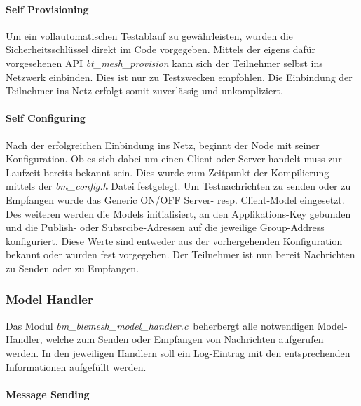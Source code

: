 \paragraph{Self Provisioning}

Um ein vollautomatischen Testablauf zu gewährleisten, wurden die Sicherheitsschlüssel direkt im Code vorgegeben. Mittels der eigens dafür vorgesehenen API \textit{bt\_mesh\_provision} kann sich der Teilnehmer selbst ins Netzwerk einbinden. Dies ist nur zu Testzwecken empfohlen. Die Einbindung der Teilnehmer ins Netz erfolgt somit zuverlässig und unkompliziert.\\

\paragraph{Self Configuring}

Nach der erfolgreichen Einbindung ins Netz, beginnt der Node mit seiner Konfiguration. Ob es sich dabei um einen Client oder Server handelt muss zur Laufzeit bereits bekannt sein. Dies wurde zum Zeitpunkt der Kompilierung mittels der \textit{bm\_config.h} Datei festgelegt. Um Testnachrichten zu senden oder zu Empfangen wurde das Generic ON/OFF Server- resp. Client-Model eingesetzt. Des weiteren werden die Models initialisiert, an den Applikations-Key gebunden und die Publish- oder Subsrcibe-Adressen auf die jeweilige Group-Address konfiguriert. Diese Werte sind entweder aus der vorhergehenden Konfiguration bekannt oder wurden fest vorgegeben. Der Teilnehmer ist nun bereit Nachrichten zu Senden oder zu Empfangen. 


 
 

\subsubsection{Model Handler}\label{subsubsec:BluetoothMeshUmsetzungnRFConnectSDKModelHandler}

Das Modul \textit{bm\_blemesh\_model\_handler.c}\footnotemark\ beherbergt alle notwendigen Model-Handler, welche zum Senden oder Empfangen von Nachrichten aufgerufen werden. In den jeweiligen Handlern soll ein Log-Eintrag mit den entsprechenden Informationen aufgefüllt werden. 




\paragraph{Message Sending}

